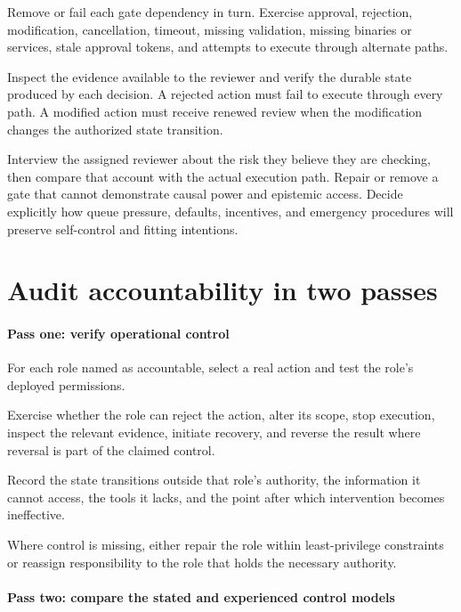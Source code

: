 Remove or fail each gate dependency in turn. Exercise approval, rejection, modification, cancellation, timeout, missing validation, missing binaries or services, stale approval tokens, and attempts to execute through alternate paths.

Inspect the evidence available to the reviewer and verify the durable state produced by each decision. A rejected action must fail to execute through every path. A modified action must receive renewed review when the modification changes the authorized state transition.

Interview the assigned reviewer about the risk they believe they are checking, then compare that account with the actual execution path. Repair or remove a gate that cannot demonstrate causal power and epistemic access. Decide explicitly how queue pressure, defaults, incentives, and emergency procedures will preserve self-control and fitting intentions.

\hypertarget{audit-accountability-in-two-passes}{%
\section{Audit accountability in two passes}\label{audit-accountability-in-two-passes}}

\hypertarget{pass-one-verify-operational-control}{%
\paragraph{Pass one: verify operational control}\label{pass-one-verify-operational-control}}

For each role named as accountable, select a real action and test the role's deployed permissions.

Exercise whether the role can reject the action, alter its scope, stop execution, inspect the relevant evidence, initiate recovery, and reverse the result where reversal is part of the claimed control.

Record the state transitions outside that role's authority, the information it cannot access, the tools it lacks, and the point after which intervention becomes ineffective.

Where control is missing, either repair the role within least-privilege constraints or reassign responsibility to the role that holds the necessary authority.

\hypertarget{pass-two-compare-the-stated-and-experienced-control-models}{%
\paragraph{Pass two: compare the stated and experienced control models}\label{pass-two-compare-the-stated-and-experienced-control-models}}

